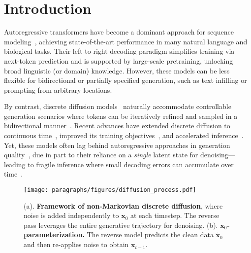 \section{Introduction}
Autoregressive transformers have become a dominant approach for sequence modeling~\citep{vaswani2017attention, chowdhery2023palm, touvron2023llama}, achieving state-of-the-art performance in many natural language and biological tasks. Their left-to-right decoding paradigm simplifies training via next-token prediction and is supported by large-scale pretraining, unlocking broad linguistic (or domain) knowledge. However, these models can be less flexible for {bidirectional or partially specified} generation, such as text infilling or prompting from arbitrary locations.

By contrast, discrete diffusion models~\citep{dieleman2022continuous, d3pm, gulrajani2024likelihood, gat2024discreteflowmatching} naturally accommodate {controllable} generation scenarios where tokens can be iteratively refined and sampled in a bidirectional manner~\citep{shen2023film}. Recent advances have extended discrete diffusion to continuous time~\citep{campbell2022continuous, shi2024simplified}, improved its training objectives~\citep{lou2024discretediffusionmodelingestimating, mdlm, udlm}, and accelerated inference~\citep{park2024textit, liu2024discrete}. Yet, these models often lag behind autoregressive approaches in generation quality~\citep{zheng2024masked}, due in part to their reliance on a \textit{single} latent state for denoising—leading to fragile inference where small decoding errors can accumulate over time~\citep{xu2024energy, zheng2024masked, hu2024mask}.

\begin{figure}[t]
    \label{fig:non-markov}
    \centering
    \texttt{[image: paragraphs/figures/diffusion\_process.pdf]}
    \vspace{-13pt}
    \caption{(a). \textbf{Framework of non-Markovian discrete diffusion}, where noise is added independently to \(\mathbf{x}_0\) at each timestep. The reverse pass leverages the entire generative trajectory for denoising. (b). \textbf{$\mathbf{x}_0$-parameterization.} The reverse model predicts the clean data \(\widetilde{\mathbf{x}}_0\) and then re-applies noise to obtain \(\mathbf{x}_{t-1}\).}
    \label{fig:enter-label}
    \vspace{-10pt}
\end{figure}

